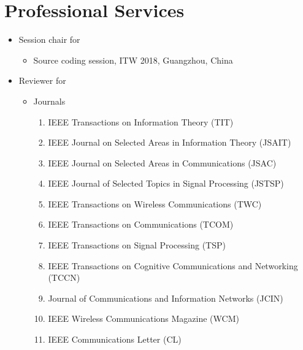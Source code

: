 \documentclass[12pt]{article} %
\begin{document}
\section{Professional Services}
\begin{itemize}
\item Session chair for
\begin{itemize}
\item Source coding session, ITW 2018, Guangzhou, China
\end{itemize}
\item Reviewer for
\begin{itemize}
\item Journals
\begin{enumerate}
\item IEEE Transactions on Information Theory (TIT)
\item IEEE Journal on Selected Areas in Information Theory (JSAIT)
\item IEEE Journal on Selected Areas in Communications (JSAC)
\item IEEE Journal of Selected Topics in Signal Processing (JSTSP)
\item IEEE Transactions on Wireless Communications (TWC)
\item IEEE Transactions on Communications (TCOM)
\item IEEE Transactions on Signal Processing (TSP)
\item IEEE Transactions on Cognitive Communications and Networking (TCCN)
\item Journal of Communications and Information Networks (JCIN)
\item IEEE Wireless Communications Magazine (WCM)
\item IEEE Communications Letter (CL)

\end{enumerate}
\end{itemize}
\end{itemize}
\end{document}
